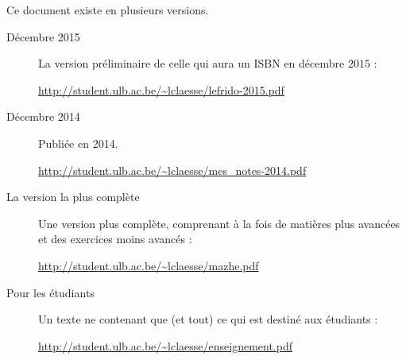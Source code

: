 
\thispagestyle{empty}

Ce document existe en plusieurs versions.
\begin{description}
    \item[Décembre 2015]

        La version préliminaire de celle qui aura un ISBN en décembre $2015$ :
        \begin{center}
            \url{http://student.ulb.ac.be/~lclaesse/lefrido-2015.pdf}
        \end{center}

    \item[Décembre 2014] 

        Publiée en 2014.
        \begin{center}
        \url{http://student.ulb.ac.be/~lclaesse/mes_notes-2014.pdf}
        \end{center}

        
    \item[La version la plus complète]

        Une version plus complète, comprenant à la fois de matières plus avancées et des exercices moins avancés : 
        \begin{center}
        \url{http://student.ulb.ac.be/~lclaesse/mazhe.pdf}
        \end{center}

    \item[Pour les étudiants]

        Un texte ne contenant que (et tout) ce qui est destiné aux étudiants :
        \begin{center}
        \url{http://student.ulb.ac.be/~lclaesse/enseignement.pdf}
        \end{center}

\end{description}


\vfill

\LogoEtLicence
\clearpage
